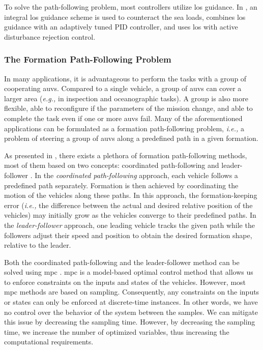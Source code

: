 To solve the path-following problem, most controllers utilize \gls{los} guidance.
In \cite{caharija_path-following-ILOS_2016}, an integral \gls{los} guidance scheme is used to counteract the sea loads, \cite{xiang_path-following-robust_2017} combines \gls{los} guidance with an adaptively tuned PID controller, and \cite{miao_path-following-curvilinear_2017} uses \gls{los} with active disturbance rejection control.

\subsubsection{The Formation Path-Following Problem}

In many applications, it is advantageous to perform the tasks with a group of cooperating \glspl{auv}.
Compared to a single vehicle, a group of \glspl{auv} can cover a larger area (\emph{e.g.,} in inspection and oceanographic tasks).
A group is also more flexible, able to reconfigure if the parameters of the mission change, and able to complete the task even if one or more \glspl{auv} fail.
Many of the aforementioned applications can be formulated as a formation path-following problem, \emph{i.e.,} a problem of steering a group of \glspl{auv} along a predefined path in a given formation.

As presented in \cite{das_cooperative_2016}, there exists a plethora of formation path-following methods, most of them based on two concepts: coordinated path-following \cite{borhaug_2006_formation,praveen_cooperative_2018} and leader-follower \cite{rongxin_2010_leader,soorki_2011_robust}.
In the \emph{coordinated path-following} approach, each vehicle follows a predefined path separately.
Formation is then achieved by coordinating the motion of the vehicles along these paths.
In this approach, the formation-keeping error (\emph{i.e.,} the difference between the actual and desired relative position of the vehicles) may initially grow as the vehicles converge to their predefined paths.
In the \emph{leader-follower} approach, one leading vehicle tracks the given path while the followers adjust their speed and position to obtain the desired formation shape, relative to the leader.

Both the coordinated path-following and the leader-follower method can be solved using \acrlong{mpc} \cite{wang_path_2021,kanjanawanishkul_distributed_2008}.
\Gls{mpc} is a model-based optimal control method that allows us to enforce constraints on the inputs and states of the vehicles.
However, most \gls{mpc} methods are based on sampling.
Consequently, any constraints on the inputs or states can only be enforced at discrete-time instances.
In other words, we have no control over the behavior of the system between the samples.
We can mitigate this issue by decreasing the sampling time.
However, by decreasing the sampling time, we increase the number of optimized variables, thus increasing the computational requirements.

